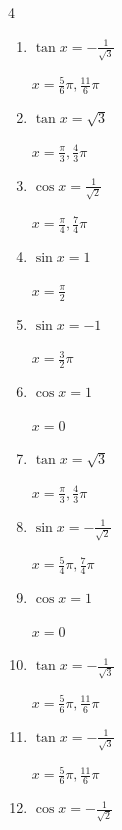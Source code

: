 \begin{multicols}{4}
\begin{enumerate}
  \item $\displaystyle \tan{x}  = -\frac{1}{\sqrt{3}}$

        $\displaystyle x = \frac{5}{6}\pi , \frac{11}{6}\pi$

  \item $\displaystyle \tan{x}  = \sqrt{3}$

        $\displaystyle x = \frac{\pi}{3} , \frac{4}{3}\pi$

  \item $\displaystyle \cos{x}  = \frac{1}{\sqrt{2}}$

        $\displaystyle x = \frac{\pi}{4} , \frac{7}{4}\pi$

  \item $\displaystyle \sin{x}  = 1$

        $\displaystyle x = \frac{\pi}{2}$

  \item $\displaystyle \sin{x}  = -1$

        $\displaystyle x = \frac{3}{2}\pi$

  \item $\displaystyle \cos{x}  = 1$

        $\displaystyle x = 0$

  \item $\displaystyle \tan{x}  = \sqrt{3}$

        $\displaystyle x = \frac{\pi}{3} , \frac{4}{3}\pi$

  \item $\displaystyle \sin{x}  = -\frac{1}{\sqrt{2}}$

        $\displaystyle x = \frac{5}{4}\pi , \frac{7}{4}\pi$

  \item $\displaystyle \cos{x}  = 1$

        $\displaystyle x = 0$

  \item $\displaystyle \tan{x}  = -\frac{1}{\sqrt{3}}$

        $\displaystyle x = \frac{5}{6}\pi , \frac{11}{6}\pi$

  \item $\displaystyle \tan{x}  = -\frac{1}{\sqrt{3}}$

        $\displaystyle x = \frac{5}{6}\pi , \frac{11}{6}\pi$

\columnbreak %

  \item $\displaystyle \cos{x}  = -\frac{1}{\sqrt{2}}$


\end{enumerate}
\end{multicols}
